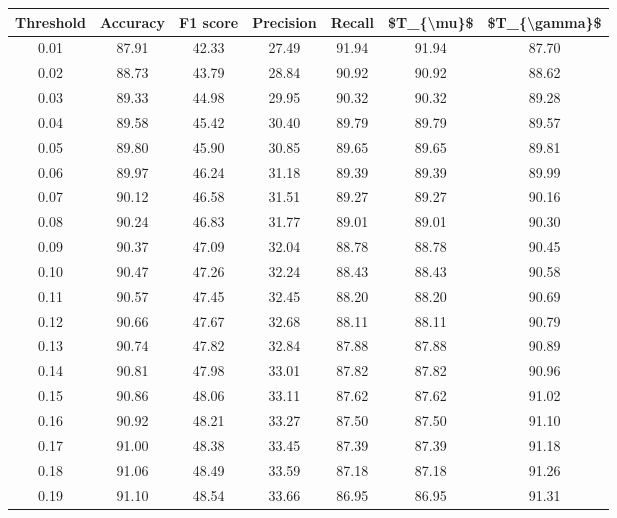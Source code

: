 \begin{tabular}{|c|c|c|c|c|c|c|}
\hline
 Threshold &  Accuracy &  F1 score &  Precision &  Recall &  \$T\_\{\textbackslash mu\}\$ &  \$T\_\{\textbackslash gamma\}\$ \\
\hline
      0.01 &     87.91 &     42.33 &      27.49 &   91.94 &      91.94 &         87.70 \\
      0.02 &     88.73 &     43.79 &      28.84 &   90.92 &      90.92 &         88.62 \\
      0.03 &     89.33 &     44.98 &      29.95 &   90.32 &      90.32 &         89.28 \\
      0.04 &     89.58 &     45.42 &      30.40 &   89.79 &      89.79 &         89.57 \\
      0.05 &     89.80 &     45.90 &      30.85 &   89.65 &      89.65 &         89.81 \\
      0.06 &     89.97 &     46.24 &      31.18 &   89.39 &      89.39 &         89.99 \\
      0.07 &     90.12 &     46.58 &      31.51 &   89.27 &      89.27 &         90.16 \\
      0.08 &     90.24 &     46.83 &      31.77 &   89.01 &      89.01 &         90.30 \\
      0.09 &     90.37 &     47.09 &      32.04 &   88.78 &      88.78 &         90.45 \\
      0.10 &     90.47 &     47.26 &      32.24 &   88.43 &      88.43 &         90.58 \\
      0.11 &     90.57 &     47.45 &      32.45 &   88.20 &      88.20 &         90.69 \\
      0.12 &     90.66 &     47.67 &      32.68 &   88.11 &      88.11 &         90.79 \\
      0.13 &     90.74 &     47.82 &      32.84 &   87.88 &      87.88 &         90.89 \\
      0.14 &     90.81 &     47.98 &      33.01 &   87.82 &      87.82 &         90.96 \\
      0.15 &     90.86 &     48.06 &      33.11 &   87.62 &      87.62 &         91.02 \\
      0.16 &     90.92 &     48.21 &      33.27 &   87.50 &      87.50 &         91.10 \\
      0.17 &     91.00 &     48.38 &      33.45 &   87.39 &      87.39 &         91.18 \\
      0.18 &     91.06 &     48.49 &      33.59 &   87.18 &      87.18 &         91.26 \\
      0.19 &     91.10 &     48.54 &      33.66 &   86.95 &      86.95 &         91.31 \\

\end{tabular}

